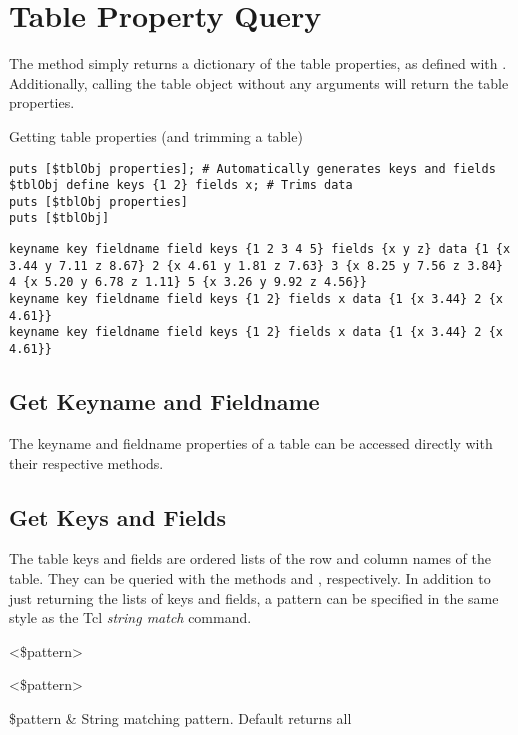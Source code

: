 \section{Table Property Query}
The method  simply returns a dictionary of the table properties, as defined with .
Additionally, calling the table object without any arguments will return the table properties.
\begin{syntax}
\end{syntax}
\begin{example}{Getting table properties (and trimming a table)}
\begin{lstlisting}
puts [$tblObj properties]; # Automatically generates keys and fields
$tblObj define keys {1 2} fields x; # Trims data
puts [$tblObj properties]
puts [$tblObj]
\end{lstlisting}
\tcblower
\begin{lstlisting}
keyname key fieldname field keys {1 2 3 4 5} fields {x y z} data {1 {x 3.44 y 7.11 z 8.67} 2 {x 4.61 y 1.81 z 7.63} 3 {x 8.25 y 7.56 z 3.84} 4 {x 5.20 y 6.78 z 1.11} 5 {x 3.26 y 9.92 z 4.56}}
keyname key fieldname field keys {1 2} fields x data {1 {x 3.44} 2 {x 4.61}}
keyname key fieldname field keys {1 2} fields x data {1 {x 3.44} 2 {x 4.61}}
\end{lstlisting}
\end{example}

\subsection{Get Keyname and Fieldname}
The keyname and fieldname properties of a table can be accessed directly with their respective methods. 
\begin{syntax}
\end{syntax}
\begin{syntax}
\end{syntax}
\subsection{Get Keys and Fields}
The table keys and fields are ordered lists of the row and column names of the table. They can be queried with the methods  and , respectively. In addition to just returning the lists of keys and fields, a pattern can be specified in the same style as the Tcl  \textit{string match} command.
\begin{syntax}
 <\$pattern>
\end{syntax}
\begin{syntax}
 <\$pattern>
\end{syntax}
\begin{args}
\$pattern & String matching pattern. Default returns all
\end{args}
\clearpage
